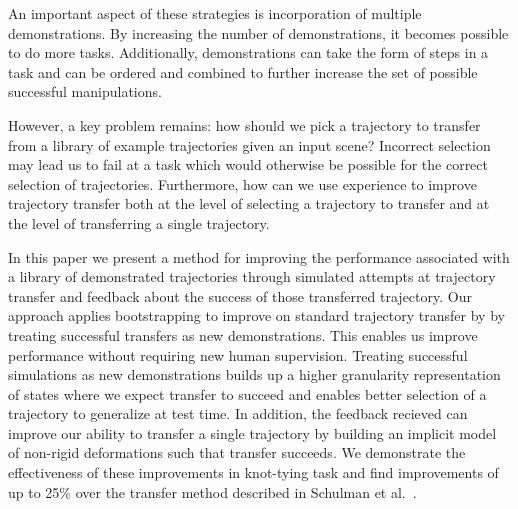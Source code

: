 An important aspect of these strategies is incorporation of multiple demonstrations. 
By increasing the number of demonstrations, it becomes possible to do more
tasks. Additionally, demonstrations can take the form of steps in a task and can be
ordered and combined to further increase the set of possible successful manipulations.

However, a key problem remains: how should we pick a trajectory to transfer
from a library of example trajectories given an input scene? Incorrect selection may lead us to fail at a task which would otherwise be possible for the correct selection of trajectories. Furthermore, how can we use experience to improve trajectory transfer 
both at the level of selecting a trajectory to transfer and at the level of transferring a single trajectory.

In this paper we present a method for improving the performance associated with
a library of demonstrated trajectories through simulated attempts at trajectory
transfer and feedback about the success of those transferred trajectory. Our approach
applies bootstrapping to improve on standard trajectory transfer by 
by treating successful transfers as new demonstrations. This enables us improve
performance without requiring new human supervision. Treating successful simulations
as new demonstrations builds up a higher granularity representation of states where
we expect transfer to succeed and enables better selection of a trajectory to 
generalize at test time. In addition, the feedback recieved can improve our ability
to transfer a single trajectory by building an implicit model of non-rigid 
deformations such that transfer succeeds. We demonstrate the effectiveness 
of these improvements in knot-tying task and find improvements  
of up to 25\% over the transfer method described in Schulman et al.~\cite{Schulmanetal_ISRR2013}.






